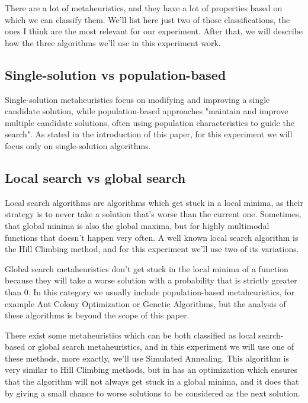 \documentclass[a4paper]{article}
\begin{document}
There are a lot of metaheuristics, and they have a lot of properties based on which we can classify them. We'll list here just two of those classifications, the ones I think are the most relevant for our experiment. After that, we will describe how the three algorithms we'll use in this experiment work.

\subsection{Single-solution vs population-based}

Single-solution metaheuristics focus on modifying and improving a single candidate solution, while population-based approaches "maintain and improve multiple candidate solutions, often using population characteristics to guide the search". As stated in the introduction of this paper, for this experiment we will focus only on single-solution algorithms. 

\subsection{Local search vs global search}

Local search algorithms are algorithms which get stuck in a local minima, as their strategy is to never take a solution that's worse than the current one. Sometimes, that global minima is also the global maxima, but for highly multimodal functions that doesn't happen very often. A well known local search algorithm is the Hill Climbing method, and for this experiment we'll use two of its variations.

Global search metaheuristics don't get stuck in the local minima of a function because they will take a worse solution with a probability that is strictly greater than 0. In this category we usually include population-based metaheuristics, for example Ant Colony Optimization or Genetic Algorithms, but the analysis of these algorithms is beyond the scope of this paper. 

There exist some metaheuristics which can be both classified as local search-based or global search metaheuristics, and in this experiment we will use one of these methods, more exactly, we'll use Simulated Annealing. This algorithm is very similar to Hill Climbing methods, but  in has an optimization which ensures that the algorithm will not always get stuck in a global minima, and it does that by giving a small chance to worse solutions to be considered as the next solution.
\end{document}

